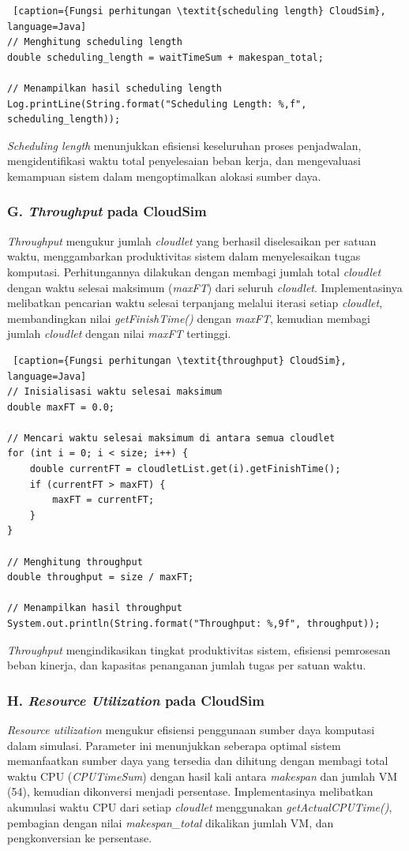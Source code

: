 \begin{lstlisting} [caption={Fungsi perhitungan \textit{scheduling length} CloudSim}, language=Java]
// Menghitung scheduling length
double scheduling_length = waitTimeSum + makespan_total;

// Menampilkan hasil scheduling length
Log.printLine(String.format("Scheduling Length: %,f", scheduling_length));
\end{lstlisting}

\textit{Scheduling length} menunjukkan efisiensi keseluruhan proses penjadwalan, mengidentifikasi waktu total penyelesaian beban kerja, dan mengevaluasi kemampuan sistem dalam mengoptimalkan alokasi sumber daya.

\subsubsection{G. \textit{Throughput} pada CloudSim}
\textit{Throughput} mengukur jumlah \textit{cloudlet} yang berhasil diselesaikan per satuan waktu, menggambarkan produktivitas sistem dalam menyelesaikan tugas komputasi. Perhitungannya dilakukan dengan membagi jumlah total \textit{cloudlet} dengan waktu selesai maksimum (\textit{maxFT}) dari seluruh \textit{cloudlet}. Implementasinya melibatkan pencarian waktu selesai terpanjang melalui iterasi setiap \textit{cloudlet}, membandingkan nilai \textit{getFinishTime()} dengan \textit{maxFT}, kemudian membagi jumlah \textit{cloudlet} dengan nilai \textit{maxFT} tertinggi.

\begin{lstlisting} [caption={Fungsi perhitungan \textit{throughput} CloudSim}, language=Java]
// Inisialisasi waktu selesai maksimum
double maxFT = 0.0;

// Mencari waktu selesai maksimum di antara semua cloudlet
for (int i = 0; i < size; i++) {
    double currentFT = cloudletList.get(i).getFinishTime();
    if (currentFT > maxFT) {
        maxFT = currentFT;
    }
}

// Menghitung throughput
double throughput = size / maxFT;

// Menampilkan hasil throughput
System.out.println(String.format("Throughput: %,9f", throughput));
\end{lstlisting}

\textit{Throughput} mengindikasikan tingkat produktivitas sistem, efisiensi pemrosesan beban kinerja, dan kapasitas penanganan jumlah tugas per satuan waktu.

\subsubsection{H. \textit{Resource Utilization} pada CloudSim}
\textit{Resource utilization} mengukur efisiensi penggunaan sumber daya komputasi dalam simulasi. Parameter ini menunjukkan seberapa optimal sistem memanfaatkan sumber daya yang tersedia dan dihitung dengan membagi total waktu CPU (\textit{CPUTimeSum}) dengan hasil kali antara \textit{makespan} dan jumlah VM (54), kemudian dikonversi menjadi persentase. Implementasinya melibatkan akumulasi waktu CPU dari setiap \textit{cloudlet} menggunakan \textit{getActualCPUTime()}, pembagian dengan nilai \textit{makespan\_total} dikalikan jumlah VM, dan pengkonversian ke persentase. 

